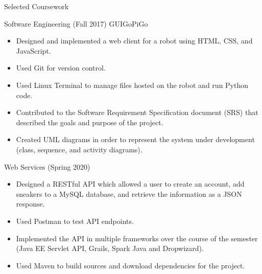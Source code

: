 \documentclass[]{johnsoncv}
\begin{document}
	\begin{cvsection}{Selected Coursework}
		
		\begin{cvsubsection}{Software Engineering (Fall 2017)}{}{}
			GUIGoPiGo
			\begin{itemize}
				\item Designed and implemented a web client for a robot using HTML, CSS, and JavaScript.
				\item Used Git for version control.
				\item Used Linux Terminal to manage files hosted on the robot and run Python code.
				\item Contributed to the Software Requirement Specification document (SRS) that described the goals and purpose of the project.
				\item Created UML diagrams in order to represent the system under development (class, sequence, and activity diagrams).
			\end{itemize}
		\end{cvsubsection}

		\begin{cvsubsection}{Web Services (Spring 2020)}{}{}
			\begin{itemize}
				\item Designed a RESTful API which allowed a user to create an account, add sneakers to a MySQL database, and retrieve the information as a JSON response.
				\item Used Postman to test API endpoints.
				\item Implemented the API in multiple frameworks over the course of the semester (Java EE Servlet API, Grails, Spark Java and Dropwizard).
				\item Used Maven to build sources and download dependencies for the project.
			\end{itemize}
		\end{cvsubsection}	

	


\end{cvsection}
\end{document}
